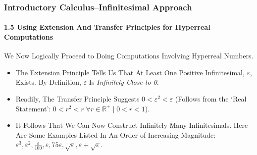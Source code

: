 \begin{frame}
\frametitle{Introductory Calculus--Infinitesimal Approach}
\framesubtitle{1.5 Using Extension And Transfer Principles for Hyperreal Computations}
\label{slide:1.5-12}
We Now Logically Proceed to Doing Computations Involving Hyperreal Numbers.
\begin{itemize}
\item The Extension Principle Tells Us That At Least One Positive Infinitesimal, $\varepsilon$, Exists. By Definition, $\varepsilon$ Is \textit{Infinitely Close to 0}.
\pause\item Readily, The Transfer Principle Suggests $0<\varepsilon^2<\varepsilon$ (Follows from the `Real Statement': $0<r^2<r\;\forall r\in\mathbb{R}^+\mid 0<r<1$).
\pause\item It Follows That We Can Now Construct Infinitely Many Infinitesimals. Here Are Some Examples Listed In An Order of Increasing Magnitude: $\varepsilon^3,\varepsilon^2,\frac{\varepsilon}{100},\varepsilon,75\varepsilon,\sqrt{\varepsilon},\varepsilon+\sqrt{\varepsilon}$.
\end{itemize}
\end{frame}
